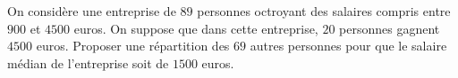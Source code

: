 
\begin{exercice}\label{exoSeconde-0016}

On considère une entreprise de \( 89\) personnes octroyant des salaires compris entre $900$ et $4500$ euros. On suppose que dans cette entreprise, $20$ personnes gagnent $4500$ euros. Proposer une répartition des \( 69\) autres personnes pour que le salaire médian de l'entreprise soit de $1500$ euros.

\end{exercice}
